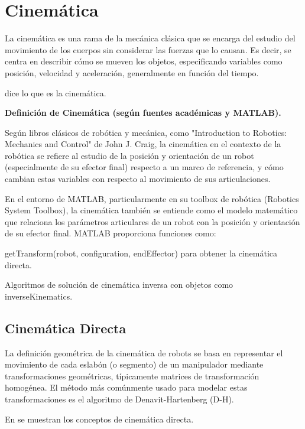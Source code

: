 \section{Cinemática} \label{sec:cinematica}

La cinemática es una rama de la mecánica clásica que se encarga del estudio del movimiento de los cuerpos sin considerar las fuerzas que lo causan. Es decir, se centra en describir cómo se mueven los objetos, especificando variables como posición, velocidad y aceleración, generalmente en función del tiempo.

\cite{conceptoCinematica} dice lo que es la cinemática.

\textbf{Definición de Cinemática (según fuentes académicas y MATLAB).}


Según libros clásicos de robótica y mecánica, como "Introduction to Robotics: Mechanics and Control" de John J. Craig, la cinemática en el contexto de la robótica se refiere al estudio de la posición y orientación de un robot (especialmente de su efector final) respecto a un marco de referencia, y cómo cambian estas variables con respecto al movimiento de sus articulaciones.

En el entorno de MATLAB, particularmente en su toolbox de robótica (Robotics System Toolbox), la cinemática también se entiende como el modelo matemático que relaciona los parámetros articulares de un robot con la posición y orientación de su efector final. MATLAB proporciona funciones como:

getTransform(robot, configuration, endEffector) para obtener la cinemática directa.

Algoritmos de solución de cinemática inversa con objetos como inverseKinematics.

\subsection{Cinemática Directa}
La definición geométrica de la cinemática de robots se basa en representar el movimiento de cada eslabón (o segmento) de un manipulador mediante transformaciones geométricas, típicamente matrices de transformación homogénea. El método más comúnmente usado para modelar estas transformaciones es el algoritmo de Denavit-Hartenberg (D-H).

En \cite{uclmFKIK} se muestran los conceptos de cinemática directa.

